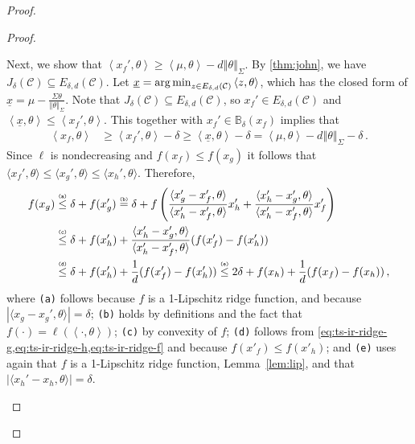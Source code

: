 \documentclass[letter, 12pt]{report}
\newcommand{\argmin}{\operatornamewithlimits{arg\,min}}
\newcommand{\explan}[1]{\stackrel{\text{\tiny \texttt{#1}}}}
\newcommand{\ip}[1]{\left \langle #1 \right \rangle}
\newcommand{\sip}[1]{\langle #1 \rangle}
\newcommand{\ball}{\mathbb{B}}
\newcommand{\norm}[1]{\left \Vert  #1 \right \Vert}
\newcommand{\cC}{\mathcal C}
\newcommand{\1}{\mathbf{1}}
\theoremstyle{plain}
\theoremstyle{definition}
\theoremstyle{remark}
\begin{document}
\begin{proof}
\begin{proof}
\begin{enumcases}
            Next, we show that $\ip{x_f', \theta} \geq \ip{\mu, \theta} - d\norm{\theta}_\Sigma$.
            By \cref{thm:john}, we have $J_\delta(\cC) \subseteq E_{\delta,d}(\cC)$.
            Let $\underline{x} = \argmin_{z \in E_{\delta,d}(\cC)} \ip{z, \theta}$,
            which has the closed form of $\underline{x} = \mu - \tfrac{\Sigma \theta}{\norm{\theta}_\Sigma}$.
            Note that $J_\delta(\cC) \subseteq E_{\delta,d}(\cC)$,
            so $x_f' \in E_{\delta,d}(\cC)$ and $\ip{\underline{x}, \theta} \leq \ip{x_f', \theta}$. This together with $x_f' \in \ball_\delta(x_f)$ implies that
            \begin{align}
                \ip{x_f, \theta} & \geq \ip{x_f', \theta} - \delta \geq \ip{\underline{x}, \theta} - \delta = \ip{\mu, \theta} - d\norm{\theta}_{\Sigma} - \delta \,.
                \label{eq:ts-ir-ridge-f}
            \end{align}
            Since $\ell$ is nondecreasing and $f(x_f) \leq f(x_g)$ it follows that $\sip{x_f', \theta} \leq \sip{x_g', \theta} \leq \sip{x_h', \theta}$.
            Therefore,
            \begin{align}
                f(x_g)
                 & \explan{(a)}\leq \delta + f(x_g')                                                                                 \nonumber
                \explan{(b)}= \delta + f\left(\frac{\sip{x_g' - x_f', \theta}}{\sip{x_h' - x_f', \theta}} x_h' + \frac{\sip{x_h' - x_g', \theta}}{\sip{x_h' - x_f',\theta}} x_f'\right) \nonumber \\
                 & \explan{(c)}\leq \delta + f(x_h') + \frac{\sip{x_h' - x_g', \theta}}{\sip{x_h' - x_f', \theta}} (f(x_f') - f(x_h')) \nonumber                                                  \\
                 & \explan{(d)}\leq \delta + f(x_h') + \frac{1}{d} (f(x_f') - f(x_h'))
                \explan{(e)}\leq 2 \delta + f(x_h) + \frac{1}{d} (f(x_f) - f(x_h)) \,, \label{eq:ts-ridge:1}
            \end{align}
            where \texttt{(a)} follows because $f$ is a 1-Lipschitz ridge function, and because
            $|\sip{x_g - x_g', \theta}| = \delta$;
            \texttt{(b)} holds by definitions and the fact that $f(\cdot) = \ell(\ip{\cdot, \theta})$;
            \texttt{(c)} by convexity of $f$;
            \texttt{(d)} follows from \cref{eq:ts-ir-ridge-g,eq:ts-ir-ridge-h,eq:ts-ir-ridge-f} and because $f(x'_f) \leq f(x'_h)$;
            and \texttt{(e)} uses again that $f$ is a 1-Lipschitz ridge function, Lemma~\ref{lem:lip}, and that $|\sip{x_h' - x_h, \theta}| = \delta$.

\end{enumcases}
\end{proof}
\end{proof}
\end{document}
